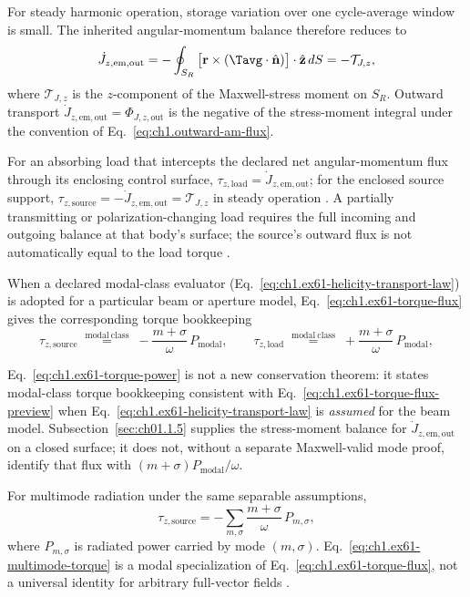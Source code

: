For steady harmonic operation, storage variation over one cycle-average window is
small. The inherited angular-momentum balance therefore reduces to
\begin{equation}
\label{eq:ch1.ex61-torque-flux}
\dot J_{z,\mathrm{em,out}}
=
-\oint_{S_R}
\big[\mathbf{r}\times(\Tavg\cdot\hat{\mathbf{n}})\big]\cdot\hat{\mathbf{z}}\,dS
=-\mathcal{T}_{J,z},
\end{equation}
where \(\mathcal{T}_{J,z}\) is the $z$-component of the Maxwell-stress moment on \(S_R\). Outward transport \(\dot J_{z,\mathrm{em,out}}=\Phi_{J,z,\mathrm{out}}\) is the negative of the stress-moment integral under the convention of Eq.~\eqref{eq:ch1.outward-am-flux}.

For an absorbing load that intercepts the declared net angular-momentum flux through its enclosing control surface, \(\tau_{z,\mathrm{load}}=\dot J_{z,\mathrm{em,out}}\); for the enclosed source support, \(\tau_{z,\mathrm{source}}=-\dot J_{z,\mathrm{em,out}}=\mathcal{T}_{J,z}\) in steady operation \cite{beth1936}. A partially transmitting or polarization-changing load requires the full incoming and outgoing balance at that body’s surface; the source’s outward flux is not automatically equal to the load torque \cite{beth1936,stratton1941}.

When a declared modal-class evaluator (Eq.~\eqref{eq:ch1.ex61-helicity-transport-law}) is adopted for a particular beam or aperture model, Eq.~\eqref{eq:ch1.ex61-torque-flux} gives the corresponding torque bookkeeping
\begin{equation}
\label{eq:ch1.worked-helical-torque}
\tau_{z,\mathrm{source}}
\;\stackrel{\mathrm{modal\ class}}{=}\;
-\frac{m+\sigma}{\omega}\,P_{\mathrm{modal}},
\qquad
\tau_{z,\mathrm{load}}
\;\stackrel{\mathrm{modal\ class}}{=}\;
+\frac{m+\sigma}{\omega}\,P_{\mathrm{modal}},
\end{equation}
\addtocounter{equation}{-1}\label{eq:ch1.ex61-torque-power}%
Eq.~\eqref{eq:ch1.ex61-torque-power} is not a new conservation theorem: it
states modal-class torque bookkeeping consistent with Eq.~\eqref{eq:ch1.ex61-torque-flux-preview} when Eq.~\eqref{eq:ch1.ex61-helicity-transport-law} is \emph{assumed} for the beam model. Subsection~\ref{sec:ch01.1.5} supplies the stress-moment balance for $\dot J_{z,\mathrm{em,out}}$ on a closed surface; it does not, without a separate Maxwell-valid mode proof, identify that flux with $(m+\sigma)P_{\mathrm{modal}}/\omega$.

For multimode radiation under the same separable assumptions,
\begin{equation}
\label{eq:ch1.ex61-multimode-torque}
\tau_{z,\mathrm{source}}
=
-\sum_{m,\sigma}\frac{m+\sigma}{\omega}\,P_{m,\sigma},
\end{equation}
where \(P_{m,\sigma}\) is radiated power carried by mode \((m,\sigma)\). Eq.~\eqref{eq:ch1.ex61-multimode-torque} is a modal specialization of Eq.~\eqref{eq:ch1.ex61-torque-flux}, not a universal identity for arbitrary full-vector fields \cite{stratton1941}.

